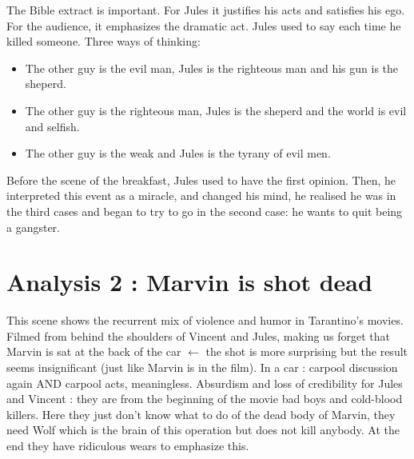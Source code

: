\documentclass[a4paper,12pt]{article}
\begin{document}
The Bible extract is important. For Jules it justifies his acts and satisfies his
ego. For the audience, it emphasizes the dramatic act.
Jules used to say each time he killed someone.
Three ways of thinking:
\begin{itemize}
    \item The other guy is the evil man, Jules is the righteous man and
his gun is the sheperd.
    \item The other guy is the righteous man, Jules is the sheperd and the world
is evil and selfish.
    \item The other guy is the weak and Jules is the tyrany of evil men.
\end{itemize}
Before the scene of the breakfast, Jules used to have the first opinion. Then, he
interpreted this event as a miracle, and changed his mind, he realised he was in
the third cases and began to try to go in the second case: he wants to quit being
a gangster.

\section{Analysis 2 : Marvin is shot dead}

This scene shows the recurrent mix of violence and humor in Tarantino's movies.
Filmed from behind the shoulders of Vincent and Jules, making us forget that Marvin
is sat at the back of the car $\leftarrow$ the shot is more surprising but the
result seems insignificant (just like Marvin is in the film). In a car : carpool
discussion again AND carpool acts, meaningless.
Absurdism and loss of credibility for Jules and Vincent : they are from the beginning
of the movie bad boys and cold-blood killers. Here they just don't know what to do of
the dead body of Marvin, they need Wolf which is the brain of this operation but does
not kill anybody. At the end they have ridiculous wears to emphasize this.
\end{document}
